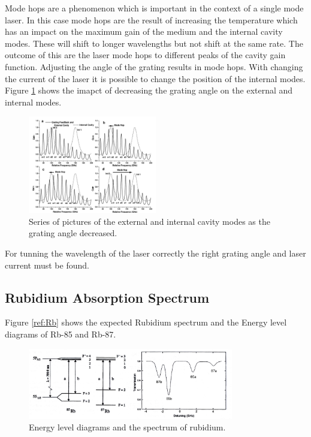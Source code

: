 Mode hops are a phenomenon which is important in the context of a single mode laser.
In this case mode hops are the result of increasing the temperature which has an impact on the maximum gain of the medium and the internal cavity modes. 
These will shift to longer wavelengths but not shift at the same rate. The outcome of this are the laser mode hops  to different peaks of the cavity gain function.
Adjusting the angle of the grating results in mode hops. With changing the current of the laser it is possible to change the position of the internal modes.
Figure \ref{fig:mode} shows the imapct of decreasing the grating angle on the external and internal modes.
\begin{figure}[H] 
    \centering
    \includegraphics[width=0.5\textwidth]{content/graphics/modehops.jpg}
    \caption{Series of pictures of the external and internal cavity modes as the grating angle decreased.\cite{diode_laser}} %
    \label{fig:mode} 
\end{figure}
For tunning the wavelength of the laser correctly the right grating angle and laser current must be found.

\subsection{Rubidium Absorption Spectrum}
\label{sec:Rubidium Absorption Spectrum}

Figure \ref{ref:Rb} shows the expected Rubidium spectrum and the Energy level diagrams of Rb-85 and Rb-87.
\begin{figure}[H]
    \centering
    \includegraphics[width=0.8\textwidth]{content/graphics/Rb.jpg}
    \caption{Energy level diagrams and the spectrum of rubidium.\cite{diode_laser}} %
    \label{fig:Rb} 
\end{figure}